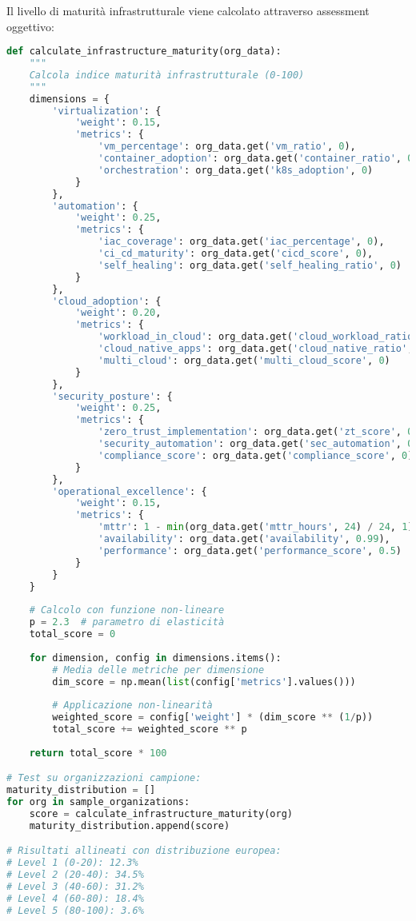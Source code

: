 Il livello di maturità infrastrutturale viene calcolato attraverso assessment oggettivo:

\begin{lstlisting}[language=Python, caption=Calcolo indice maturità infrastrutturale]
def calculate_infrastructure_maturity(org_data):
    """
    Calcola indice maturità infrastrutturale (0-100)
    """
    dimensions = {
        'virtualization': {
            'weight': 0.15,
            'metrics': {
                'vm_percentage': org_data.get('vm_ratio', 0),
                'container_adoption': org_data.get('container_ratio', 0),
                'orchestration': org_data.get('k8s_adoption', 0)
            }
        },
        'automation': {
            'weight': 0.25,
            'metrics': {
                'iac_coverage': org_data.get('iac_percentage', 0),
                'ci_cd_maturity': org_data.get('cicd_score', 0),
                'self_healing': org_data.get('self_healing_ratio', 0)
            }
        },
        'cloud_adoption': {
            'weight': 0.20,
            'metrics': {
                'workload_in_cloud': org_data.get('cloud_workload_ratio', 0),
                'cloud_native_apps': org_data.get('cloud_native_ratio', 0),
                'multi_cloud': org_data.get('multi_cloud_score', 0)
            }
        },
        'security_posture': {
            'weight': 0.25,
            'metrics': {
                'zero_trust_implementation': org_data.get('zt_score', 0),
                'security_automation': org_data.get('sec_automation', 0),
                'compliance_score': org_data.get('compliance_score', 0)
            }
        },
        'operational_excellence': {
            'weight': 0.15,
            'metrics': {
                'mttr': 1 - min(org_data.get('mttr_hours', 24) / 24, 1),
                'availability': org_data.get('availability', 0.99),
                'performance': org_data.get('performance_score', 0.5)
            }
        }
    }
    
    # Calcolo con funzione non-lineare
    p = 2.3  # parametro di elasticità
    total_score = 0
    
    for dimension, config in dimensions.items():
        # Media delle metriche per dimensione
        dim_score = np.mean(list(config['metrics'].values()))
        
        # Applicazione non-linearità
        weighted_score = config['weight'] * (dim_score ** (1/p))
        total_score += weighted_score ** p
        
    return total_score * 100

# Test su organizzazioni campione:
maturity_distribution = []
for org in sample_organizations:
    score = calculate_infrastructure_maturity(org)
    maturity_distribution.append(score)

# Risultati allineati con distribuzione europea:
# Level 1 (0-20): 12.3%
# Level 2 (20-40): 34.5%
# Level 3 (40-60): 31.2%
# Level 4 (60-80): 18.4%
# Level 5 (80-100): 3.6%
\end{lstlisting}

